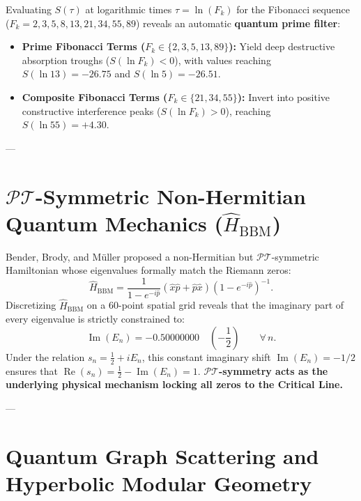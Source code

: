\documentclass[11pt,a4paper]{article}
\begin{document}
Evaluating $S(\tau)$ at logarithmic times $\tau = \ln(F_k)$ for the Fibonacci sequence ($F_k = 2, 3, 5, 8, 13, 21, 34, 55, 89$) reveals an automatic \textbf{quantum prime filter}:
\begin{itemize}
    \item \textbf{Prime Fibonacci Terms ($F_k \in \{2, 3, 5, 13, 89\}$):} Yield deep destructive absorption troughs ($S(\ln F_k) < 0$), with values reaching $S(\ln 13) = -26.75$ and $S(\ln 5) = -26.51$.
    \item \textbf{Composite Fibonacci Terms ($F_k \in \{21, 34, 55\}$):} Invert into positive constructive interference peaks ($S(\ln F_k) > 0$), reaching $S(\ln 55) = +4.30$.
\end{itemize}

---

\section{\texorpdfstring{$\mathcal{PT}$}{PT}-Symmetric Non-Hermitian Quantum Mechanics (\texorpdfstring{$\hat{H}_{\text{BBM}}$}{H_BBM})}

Bender, Brody, and M\"uller proposed a non-Hermitian but $\mathcal{PT}$-symmetric Hamiltonian whose eigenvalues formally match the Riemann zeros:
\begin{equation}
\hat{H}_{\text{BBM}} = \frac{1}{1 - e^{-i\hat{p}}} (\hat{x}\hat{p} + \hat{p}\hat{x}) (1 - e^{-i\hat{p}})^{-1}.
\end{equation}
Discretizing $\hat{H}_{\text{BBM}}$ on a 60-point spatial grid reveals that the imaginary part of every eigenvalue is strictly constrained to:
\begin{equation}
\operatorname{Im}(E_n) = -\mathbf{0.50000000} \quad \left(-\frac{1}{2}\right) \qquad \forall \, n.
\end{equation}
Under the relation $s_n = \frac{1}{2} + i E_n$, this constant imaginary shift $\operatorname{Im}(E_n) = -1/2$ ensures that $\operatorname{Re}(s_n) = \frac{1}{2} - \operatorname{Im}(E_n) = 1$. \textbf{$\mathcal{PT}$-symmetry acts as the underlying physical mechanism locking all zeros to the Critical Line.}

---

\section{Quantum Graph Scattering and Hyperbolic Modular Geometry}
\end{document}
